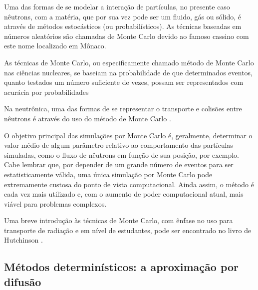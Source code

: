 Uma das formas de se modelar a interação de partículas, no presente caso nêutrons,
com a matéria, que por sua vez pode ser um fluido, gás ou sólido, é através de
métodos estocásticos (ou probabilísticos). As técnicas baseadas em números
aleatórios são chamadas de Monte Carlo devido ao famoso cassino com este nome
localizado em Mônaco.

As técnicas de Monte Carlo, ou especificamente chamado método de Monte Carlo
nas ciências nucleares, se baseiam na probabilidade de que determinados eventos,
quanto testados um número suficiente de vezes, possam ser representados
com acurácia por probabilidades

Na neutrônica, uma das formas de se representar o transporte
e colisões entre nêutrons é através do
uso do método de Monte Carlo \cite{Hutchinson2015}.



O objetivo principal das simulações por Monte Carlo é, geralmente, determinar
o valor médio de algum parâmetro relativo ao comportamento das partículas simuladas, como o fluxo de
nêutrons em função de sua posição, por exemplo. Cabe lembrar que, por depender
de um grande número de eventos para ser estatisticamente válida, uma única
simulação por Monte Carlo pode extremamente custosa do ponto de vista computacional.
Ainda assim, o método é cada vez mais utilizado e, com o aumento de poder
computacional atual, mais viável para problemas complexos.

Uma breve introdução às técnicas de Monte Carlo, com ênfase no uso para
transporte de radiação e em nível de estudantes, pode ser encontrado
no livro de Hutchinson \cite{Hutchinson2015}.


\subsection{Métodos determinísticos: a aproximação por difusão}
\label{subsec:det}

